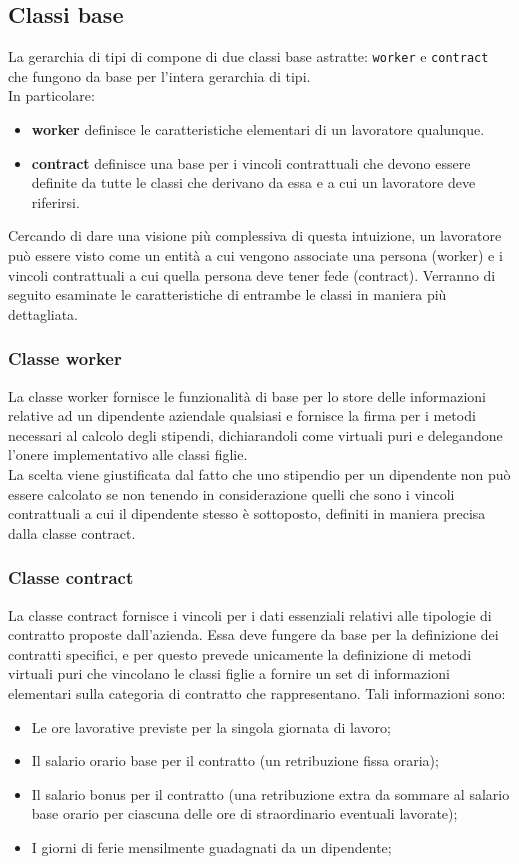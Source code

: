 \documentclass[a4paper,10pt]{article}
\begin{document}
\subsection{Classi base}
La gerarchia di tipi di compone di due classi base astratte: \verb+worker+ e \verb+contract+ che fungono da base per l'intera gerarchia di tipi. \\
In particolare:\\
\begin{itemize}
\item \textbf{worker} definisce le caratteristiche elementari di un lavoratore qualunque.
\item \textbf{contract} definisce una base per i vincoli contrattuali che devono essere definite da tutte le classi che derivano da essa e a cui un lavoratore deve riferirsi.
\end{itemize}
Cercando di dare una visione più complessiva di questa intuizione, un lavoratore può essere visto come un entità a cui vengono associate una persona (worker) e i vincoli contrattuali a cui quella persona deve tener fede (contract). Verranno di seguito esaminate le caratteristiche di entrambe le classi in maniera più dettagliata.
\subsubsection{Classe worker}
La classe worker fornisce le funzionalità di base per lo store delle informazioni relative ad un dipendente aziendale qualsiasi e fornisce la firma per i metodi necessari al calcolo degli stipendi, dichiarandoli come virtuali puri e delegandone l'onere implementativo alle classi figlie.\\
La scelta viene giustificata dal fatto che uno stipendio per un dipendente non può essere calcolato se non tenendo in considerazione quelli che sono i vincoli contrattuali a cui il dipendente stesso è sottoposto, definiti in maniera precisa dalla classe contract.
\subsubsection{Classe contract}
La classe contract fornisce i vincoli per i dati essenziali relativi alle tipologie di contratto proposte dall’azienda. Essa deve fungere da base per la definizione dei contratti specifici, e per questo prevede unicamente la definizione di metodi virtuali puri che vincolano le classi figlie a fornire un set di informazioni elementari sulla categoria di contratto che rappresentano.
Tali informazioni sono:\\
\begin{itemize}
\item Le ore lavorative previste per la singola giornata di lavoro;
\item Il salario orario base per il contratto (un retribuzione fissa oraria);
\item Il salario bonus per il contratto (una retribuzione extra da sommare al salario base orario per ciascuna delle ore di straordinario eventuali lavorate);
\item I giorni di ferie mensilmente guadagnati da un dipendente;
\end{itemize}
\end{document}
